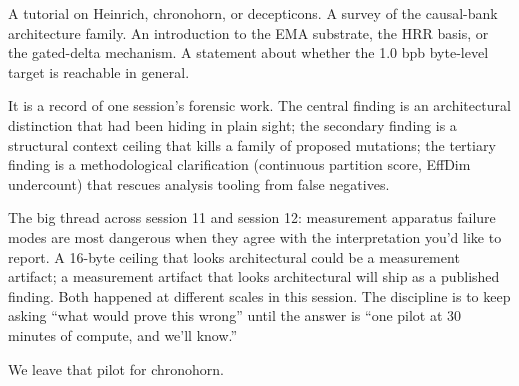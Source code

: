\documentclass[11pt,openany]{book}
\begin{document}
A tutorial on Heinrich, chronohorn, or decepticons. A survey of the
causal-bank architecture family. An introduction to the EMA substrate, the
HRR basis, or the gated-delta mechanism. A statement about whether the
1.0 bpb byte-level target is reachable in general.

It is a record of one session's forensic work. The central finding is an
architectural distinction that had been hiding in plain sight; the
secondary finding is a structural context ceiling that kills a family of
proposed mutations; the tertiary finding is a methodological clarification
(continuous partition score, EffDim undercount) that rescues analysis
tooling from false negatives.

The big thread across session 11 and session 12: measurement apparatus
failure modes are most dangerous when they agree with the interpretation
you'd like to report. A 16-byte ceiling that looks architectural could be a
measurement artifact; a measurement artifact that looks architectural will
ship as a published finding. Both happened at different scales in this
session. The discipline is to keep asking ``what would prove this wrong''
until the answer is ``one pilot at 30 minutes of compute, and we'll know.''

We leave that pilot for chronohorn.
\end{document}
